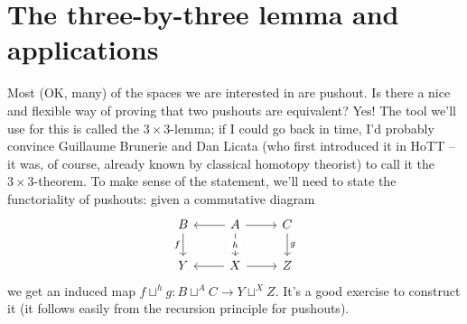 \documentclass[10pt,oneside,leqno,openright]{memoir}
\begin{document}
\section*{The three-by-three lemma and applications}
Most (OK, many) of the spaces we are interested in are pushout.
%
Is there a nice and flexible way of proving that two pushouts are equivalent? Yes!
%
The tool we'll use for this is called the $3\times 3$-lemma; if I could go back in time, I'd probably convince Guillaume Brunerie and Dan Licata (who first introduced it in HoTT -- it was, of course, already known by classical homotopy theorist) to call it the $3\times 3$-theorem.
%
To make sense of the statement, we'll need to state the functoriality of pushouts: given a commutative diagram
\[\begin{tikzcd}[ampersand replacement=\&]
	B \& A \& C \\
	Y \& X \& Z
	\arrow["f"', from=1-1, to=2-1]
	\arrow[from=1-2, to=1-1]
	\arrow[from=1-2, to=1-3]
	\arrow["h"{description}, from=1-2, to=2-2]
	\arrow["g", from=1-3, to=2-3]
	\arrow[from=2-2, to=2-1]
	\arrow[from=2-2, to=2-3]
\end{tikzcd}\]
we get an induced map $f \sqcup^h g : B \sqcup^A C \to Y \sqcup^X Z$. It's a good exercise to construct it (it follows easily from the recursion principle for pushouts).
\end{document}
